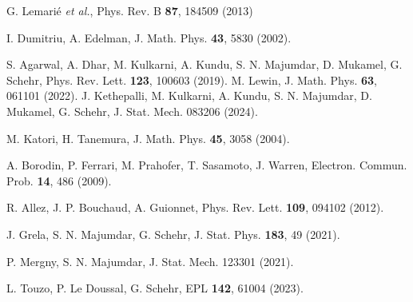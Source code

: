 \documentclass[onecolumn,superscriptaddress,
 amsmath,amssymb,
 aps,
 prd,
]{revtex4-1}
\begin{document}
\begin{thebibliography}{1}
G. Lemari{\'e} {\it et al.}, Phys. Rev. B {\bf 87}, 184509 (2013)

 I. Dumitriu, A. Edelman, J. Math. Phys. {\bf 43}, 5830 (2002).


S. Agarwal, A. Dhar, M. Kulkarni, A. Kundu, S. N. Majumdar, D. Mukamel, G. Schehr, Phys. Rev. Lett. {\bf 123}, 100603 (2019).
M. Lewin, J. Math. Phys. {\bf 63}, 061101 (2022).
J. Kethepalli, M. Kulkarni, A. Kundu, S. N. Majumdar, D. Mukamel, G. Schehr, J. Stat. Mech. 083206 (2024).


M. Katori, H. Tanemura, J. Math. Phys. {\bf 45}, 3058 (2004).

A. Borodin, P. Ferrari, M. Prahofer, T. Sasamoto, J. Warren, Electron. Commun. Prob. {\bf 14}, 486 (2009). 




R. Allez, J. P. Bouchaud, A. Guionnet, Phys. Rev. Lett. {\bf 109}, 094102 (2012).

J. Grela, S. N. Majumdar, G. Schehr, J. Stat. Phys. {\bf 183}, 49 (2021).

P. Mergny, S. N. Majumdar, J. Stat. Mech. 123301 (2021).

L. Touzo, P. Le Doussal, G. Schehr, EPL {\bf 142}, 61004 (2023).





%


\end{thebibliography}
\end{document}
